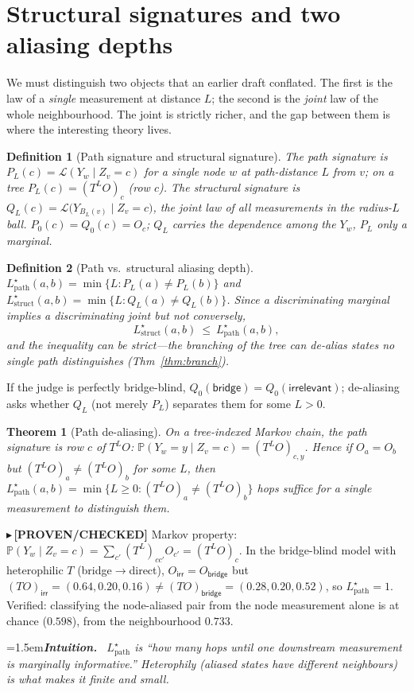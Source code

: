 \documentclass[11pt]{article}
\newtheorem{theorem}{Theorem}
\newtheorem{definition}{Definition}
\newcommand{\PROVEN}[1]{{\color{teal}\small$\blacktriangleright$\,\textbf{[PROVEN/CHECKED]} #1}}
\newenvironment{intuition}{\par\smallskip\noindent\hangindent=1.5em\textbf{\itshape Intuition.}\itshape\ \ignorespaces}{\par\smallskip}
\renewcommand{\Pr}{\mathbb{P}}\newcommand{\I}{\mathbb{I}}\newcommand{\HH}{\mathbb{H}}
\begin{document}
\section{Structural signatures and two aliasing depths}
We must distinguish two objects that an earlier draft conflated. The first is the law of a \emph{single}
measurement at distance $L$; the second is the \emph{joint} law of the whole neighbourhood. The joint is strictly
richer, and the gap between them is where the interesting theory lives.
\begin{definition}[Path signature and structural signature]
The \emph{path signature} is $P_L(c)=\mathcal L(Y_w\mid Z_v=c)$ for a single node $w$ at path-distance $L$ from
$v$; on a tree $P_L(c)=(T^{L}O)_c$ (row $c$). The \emph{structural signature} is
$Q_L(c)=\mathcal L\big(Y_{B_L(v)}\mid Z_v=c\big)$, the \emph{joint} law of \emph{all} measurements in the
radius-$L$ ball. $P_0(c)=Q_0(c)=O_c$; $Q_L$ carries the dependence among the $Y_w$, $P_L$ only a marginal.
\end{definition}
\begin{definition}[Path vs.\ structural aliasing depth]
$L^\star_{\mathrm{path}}(a,b)=\min\{L:P_L(a)\neq P_L(b)\}$ and
$L^\star_{\mathrm{struct}}(a,b)=\min\{L:Q_L(a)\neq Q_L(b)\}$. Since a discriminating marginal implies a
discriminating joint but not conversely,
\[
   L^\star_{\mathrm{struct}}(a,b)\ \le\ L^\star_{\mathrm{path}}(a,b),
\]
and the inequality can be strict---the branching of the tree can de-alias states no single path distinguishes
(Thm~\ref{thm:branch}).
\end{definition}
If the judge is perfectly bridge-blind, $Q_0(\textsf{bridge})=Q_0(\textsf{irrelevant})$; de-aliasing asks whether
$Q_L$ (not merely $P_L$) separates them for some $L>0$.

\begin{theorem}[Path de-aliasing]\label{thm:dealias}
On a tree-indexed Markov chain, the path signature is row $c$ of $T^{L}O$:
$\Pr(Y_w=y\mid Z_v=c)=(T^{L}O)_{c,y}$. Hence if $O_a=O_b$ but $(T^{L}O)_a\neq(T^{L}O)_b$ for some $L$, then
$L^\star_{\mathrm{path}}(a,b)=\min\{L\ge0:(T^{L}O)_a\neq(T^{L}O)_b\}$ hops suffice for a \emph{single}
measurement to distinguish them.
\end{theorem}
\PROVEN{Markov property: $\Pr(Y_w\mid Z_v{=}c)=\sum_{c'}(T^{L})_{cc'}O_{c'}=(T^{L}O)_{c}$. In the bridge-blind
model with heterophilic $T$ (bridge$\to$direct), $O_{\textsf{irr}}=O_{\textsf{bridge}}$ but
$(TO)_{\textsf{irr}}=(0.64,0.20,0.16)\neq(TO)_{\textsf{bridge}}=(0.28,0.20,0.52)$, so
$L^\star_{\mathrm{path}}=1$. Verified: classifying the node-aliased pair from the node measurement alone is at
chance ($0.598$), from the neighbourhood $0.733$.}
\begin{intuition}
$L^\star_{\mathrm{path}}$ is ``how many hops until \emph{one} downstream measurement is marginally informative.''
Heterophily (aliased states have different neighbours) is what makes it finite and small.
\end{intuition}
\end{document}
